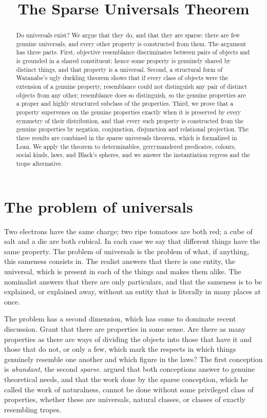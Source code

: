 \documentclass{situationist-preprint}
\title{The Sparse Universals Theorem}
\begin{document}
\maketitle

\begin{abstract}
Do universals exist? We argue that they do, and that they are sparse: there are few genuine universals, and every other property is constructed from them. The argument has three parts. First, objective resemblance discriminates between pairs of objects and is grounded in a shared constituent; hence some property is genuinely shared by distinct things, and that property is a universal. Second, a structural form of Watanabe's ugly duckling theorem shows that if every class of objects were the extension of a genuine property, resemblance could not distinguish any pair of distinct objects from any other; resemblance does so distinguish, so the genuine properties are a proper and highly structured subclass of the properties. Third, we prove that a property supervenes on the genuine properties exactly when it is preserved by every symmetry of their distribution, and that every such property is constructed from the genuine properties by negation, conjunction, disjunction and relational projection. The three results are combined in the sparse universals theorem, which is formalized in Lean. We apply the theorem to determinables, gerrymandered predicates, colours, social kinds, laws, and Black's spheres, and we answer the instantiation regress and the trope alternative.
\end{abstract}

\section{The problem of universals}

Two electrons have the same charge; two ripe tomatoes are both red; a cube of salt and a die are both cubical. In each case we say that different things have the same property. The problem of universals is the problem of what, if anything, this sameness consists in. The realist answers that there is one entity, the universal, which is present in each of the things and makes them alike. The nominalist answers that there are only particulars, and that the sameness is to be explained, or explained away, without an entity that is literally in many places at once.

The problem has a second dimension, which has come to dominate recent discussion. Grant that there are properties in some sense. Are there as many properties as there are ways of dividing the objects into those that have it and those that do not, or only a few, which mark the respects in which things genuinely resemble one another and which figure in the laws? The first conception is \emph{abundant}, the second \emph{sparse}. \citet{Lewis1983} argued that both conceptions answer to genuine theoretical needs, and that the work done by the sparse conception, which he called the work of naturalness, cannot be done without some privileged class of properties, whether these are universals, natural classes, or classes of exactly resembling tropes.
\end{document}
